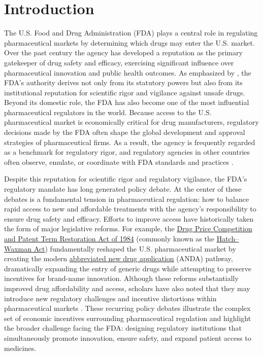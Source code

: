 \section{Introduction}

The U.S. Food and Drug Administration (FDA) plays a central role in regulating pharmaceutical markets by determining which drugs may enter the U.S. market. Over the past century the agency has developed a reputation as the primary gatekeeper of drug safety and efficacy, exercising significant influence over pharmaceutical innovation and public health outcomes. As emphasized by \textcite{carpenterINTRODUCTIONGatekeeper2010}, the FDA’s authority derives not only from its statutory powers but also from its institutional reputation for scientific rigor and vigilance against unsafe drugs. Beyond its domestic role, the FDA has also become one of the most influential pharmaceutical regulators in the world. Because access to the U.S. pharmaceutical market is economically critical for drug manufacturers, regulatory decisions made by the FDA often shape the global development and approval strategies of pharmaceutical firms. As a result, the agency is frequently regarded as a benchmark for regulatory rigor, and regulatory agencies in other countries often observe, emulate, or coordinate with FDA standards and practices \parencite{carpenterAmericanPharmaceuticalRegulation2010}.

Despite this reputation for scientific rigor and regulatory vigilance, the FDA’s regulatory mandate has long generated policy debate. At the center of these debates is a fundamental tension in pharmaceutical regulation: how to balance rapid access to new and affordable treatments with the agency’s responsibility to ensure drug safety and efficacy. Efforts to improve access have historically taken the form of major legislative reforms. For example, the \href{https://www.congress.gov/bill/98th-congress/house-bill/3605}{Drug Price Competition and Patent Term Restoration Act of 1984} (commonly known as the \href{https://www.fda.gov/drugs/abbreviated-new-drug-application-anda/hatch-waxman-letters}{Hatch–Waxman Act}) fundamentally reshaped the U.S. pharmaceutical market by creating the modern \href{https://www.fda.gov/drugs/types-applications/abbreviated-new-drug-application-anda}{abbreviated new drug application} (ANDA) pathway, dramatically expanding the entry of generic drugs while attempting to preserve incentives for brand-name innovation. Although these reforms substantially improved drug affordability and access, scholars have also noted that they may introduce new regulatory challenges and incentive distortions within pharmaceutical markets \parencite{mehlHatchWaxmanActMarket2006}. These recurring policy debates illustrate the complex set of economic incentives surrounding pharmaceutical regulation and highlight the broader challenge facing the FDA: designing regulatory institutions that simultaneously promote innovation, ensure safety, and expand patient access to medicines.

